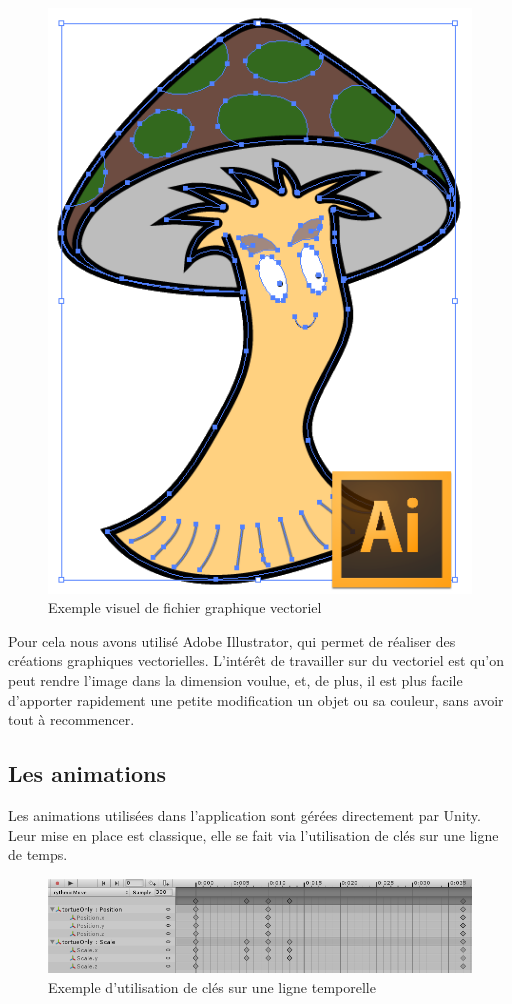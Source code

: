 \begin{figure}[H]\centering
  \includegraphics[scale=.6]{./img/technique_graphismes.png}
  \caption{Exemple visuel de fichier graphique vectoriel}
\end{figure}

Pour cela nous avons utilisé Adobe Illustrator, qui permet de réaliser des créations graphiques vectorielles. L'intérêt de travailler sur du vectoriel est qu'on peut rendre l'image dans la dimension voulue, et, de plus, il est plus facile d'apporter rapidement une petite modification un objet ou sa couleur, sans avoir tout à recommencer.

\subsection{Les animations}
\label{anims}
Les animations utilisées dans l'application sont gérées directement par Unity. Leur mise en place est classique, elle se fait via l'utilisation de clés sur une ligne de temps. 

\begin{figure}[H]\centering
  \includegraphics[scale=.55]{./img/technique_animation1.png}
  \caption{Exemple d'utilisation de clés sur une ligne temporelle}
  \label{technique_animation1}
\end{figure}

